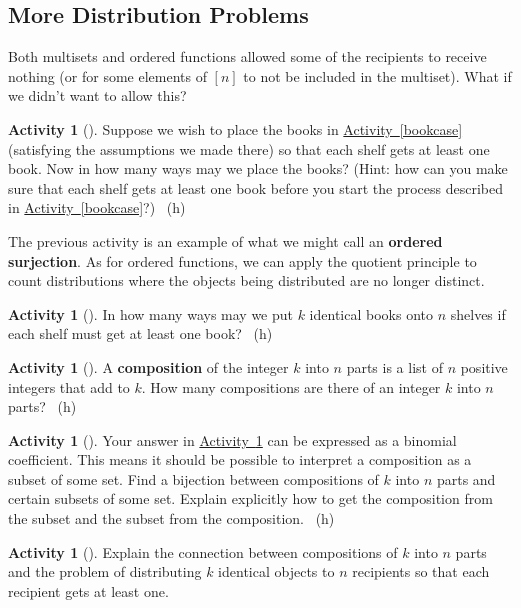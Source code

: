 \documentclass[10pt,]{book}
\newcommand{\terminology}[1]{\textbf{#1}}
\theoremstyle{plain}
\theoremstyle{definition}
\theoremstyle{definition}
\theoremstyle{definition}
\newtheorem{activity}[project]{Activity}
\numberwithin{equation}{chapter}
\begin{document}
\subsection[{More Distribution Problems}]{More Distribution Problems}\label{subsec-moredistributions}
\hypertarget{p-854}{}%
Both multisets and ordered functions allowed some of the recipients to receive nothing (or for some elements of \([n]\) to not be included in the multiset).  What if we didn't want to allow this?%
\begin{activity}[]\label{bookcaseeveryshelf}
\hypertarget{p-855}{}%
Suppose we wish to place the books in \hyperref[bookcase]{Activity~\ref{bookcase}} (satisfying the assumptions we made there) so that each shelf gets at least one book. Now in how many ways may we place the books? (Hint: how can you make sure that each shelf gets at least one book before you start the process described in \hyperref[bookcase]{Activity~\ref{bookcase}}?)%
~{\tiny (h)}\end{activity}
\hypertarget{p-858}{}%
The previous activity is an example of what we might call an \terminology{ordered surjection}.  As for ordered functions, we can apply the quotient principle to count distributions where the objects being distributed are no longer distinct.%
\begin{activity}[]\label{activity-120}
\hypertarget{p-859}{}%
In how many ways may we put \(k\) identical books onto \(n\) shelves if each shelf must get at least one book?%
~{\tiny (h)}\end{activity}
\begin{activity}[]\label{compositionagian}
\hypertarget{p-862}{}%
A \terminology{composition} of the integer \(k\) into \(n\) parts is a list of \(n\) positive integers that add to \(k\).  How many compositions are there of an integer \(k\) into \(n\) parts?%
~{\tiny (h)}\end{activity}
\begin{activity}[]\label{activity-122}
\hypertarget{p-865}{}%
Your answer in \hyperref[compositionagian]{Activity~\ref{compositionagian}} can be expressed as a binomial coefficient. This means it should be possible to interpret a composition as a subset of some set. Find a bijection between compositions of \(k\) into \(n\) parts and certain subsets of some set.  Explain explicitly how to get the composition from the subset and the subset from the composition.%
~{\tiny (h)}\end{activity}
\begin{activity}[]\label{activity-123}
\hypertarget{p-868}{}%
Explain the connection between compositions of \(k\) into \(n\) parts and the problem of distributing \(k\) identical objects to \(n\) recipients so that each recipient gets at least one.%
\end{activity}
\end{document}
